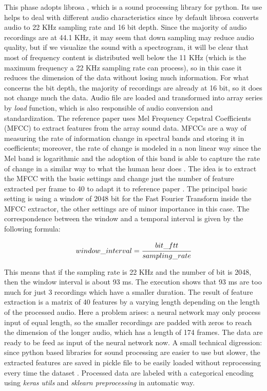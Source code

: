 \documentclass{article}
\begin{document}
This phase adopts librosa \cite{mcfee2015librosa}, which is a sound processing library for python. Its use helps to deal with different audio characteristics since by default librosa converts audio to 22 KHz sampling rate and 16 bit depth. Since the majority of audio recordings are at 44.1 KHz, it may seem that down sampling may reduce audio quality, but if we visualize the sound with a spectrogram, it will be clear that most of frequency content is distributed well below the 11 KHz (which is the maximum frequency a 22 KHz sampling rate can process), so in this case it reduces the dimension of the data without losing much information. For what concerns the bit depth, the majority of recordings are already at 16 bit, so it does not change much the data. Audio file are loaded and transformed into array series by \textit{load} function, which is also responsible of audio conversion and standardization.\newline
The reference paper \cite{drossos2020sound} uses Mel Frequency Cepstral Coefficients (MFCC) to extract features from the array sound data. MFCCs are a way of measuring the rate of information change in spectral bands and storing it in coefficients; moreover, the rate of change is modeled in a non linear way since the Mel band is logarithmic and the adoption of this band is able to capture the rate of change in a similar way to what the human hear does \cite{MFCC}. \newline
The idea is to extract the MFCC with the basic settings and change just the number of feature extracted per frame to 40 to adapt it to reference paper \cite{drossos2020sound}. The principal basic setting is using a window of 2048 bit for the Fast Fourier Transform inside the MFCC extractor, the other settings are of minor importance in this case. The correspondence between the window and a temporal interval is given by the following formula: 
 
\begin{equation} \label{eq:window_interval}
	window\_interval = \cfrac{bit\_ftt}{sampling\_rate}
\end{equation}

This means that if the sampling rate is 22 KHz and the number of bit is 2048, then the window interval is about 93 ms. The execution shows that 93 ms are too much for just 3 recordings which have a smaller duration. The result of feature extraction is a matrix of 40 features by a varying length depending on the length of the processed audio. Here a problem arises: a neural network may only process input of equal length, so the smaller recordings are padded with zeros to reach the dimension of the longer audio, which has a length of 174 frames. The data are ready to be feed as input of the neural network now.\newline
A small technical digression: since python based libraries for sound processing are easier to use but slower, the extracted features are saved in pickle file to be easily loaded without reprocessing every time the dataset \cite{pickle}.\newline
Processed data are labeled with a categorical encoding using \textit{keras utils} and \textit{sklearn preprocessing} in automatic way.
\end{document}
